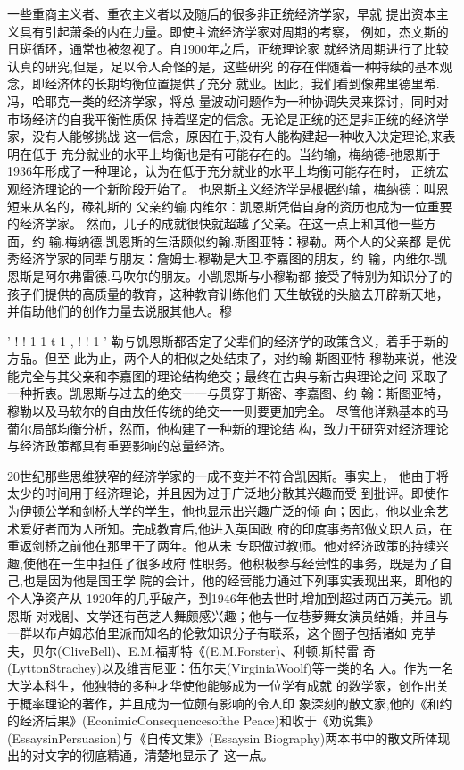 一些重商主义者、重农主义者以及随后的很多非正统经济学家，早就
提出资本主义具有引起萧条的内在力量。即使主流经济学家对周期的考察，
例如，杰文斯的日斑循环，通常也被忽视了。自1900年之后，正统理论家
就经济周期进行了比较认真的研究,但是，足以令人奇怪的是，这些研究
的存在伴随着一种持续的基本观念，即经济体的长期均衡位置提供了充分
就业。因此，我们看到像弗里德里希.冯，哈耶克一类的经济学家，将总
量波动问题作为一种协调失灵来探讨，同时对市场经济的自我平衡性质保
持着坚定的信念。无论是正统的还是非正统的经济学家，没有人能够挑战
这一信念，原因在于,没有人能构建起一种收入决定理论,来表明在低于
充分就业的水平上均衡也是有可能存在的。当约输，梅纳德-弛恩斯于
1936年形成了一种理论，认为在低于充分就业的水平上均衡可能存在时，
正统宏观经济理论的一个新阶段开始了。
也恩斯主义经济学是根据约输，梅纳德：叫恩短来从名的，碌礼斯的
父亲约输.内维尔：凯恩斯凭借自身的资历也成为一位重要的经济学家。
然而，儿子的成就很快就超越了父亲。在这一点上和其他一些方面，约
输.梅纳德.凯恩斯的生活颇似约翰.斯图亚特：穆勒。两个人的父亲都
是优秀经济学家的同辈与朋友：詹姆士.穆勒是大卫.李嘉图的朋友，约
输，内维尔-凯恩斯是阿尔弗雷德.马吹尔的朋友。小凯恩斯与小穆勒都
接受了特别为知识分子的孩子们提供的高质量的教育，这种教育训练他们
天生敏锐的头脑去开辟新天地，并借助他们的创作力量去说服其他人。穆


'
!
!
1
1
t
1
,
!
!
1
'
勒与饥恩斯都否定了父辈们的经济学的政策含义，着手于新的方品。但至
此为止，两个人的相似之处结束了，对约翰-斯图亚特-穆勒来说，他没
能完全与其父亲和李嘉图的理论结构绝交；最终在古典与新古典理论之间
采取了一种折衷。凯恩斯与过去的绝交一一与贯穿于斯密、李嘉图、约
翰：斯图亚特，穆勒以及马软尔的自由放任传统的绝交一一则要更加完全。
尽管他详熟基本的马葡尔局部均衡分析，然而，他构建了一种新的理论结
构，致力于研究对经济理论与经济政策都具有重要影响的总量经济。

20世纪那些思维狭窄的经济学家的一成不变并不符合凯因斯。事实上，
他由于将太少的时间用于经济理论，并且因为过于广泛地分散其兴趣而受
到批评。即使作为伊顿公学和剑桥大学的学生，他也显示出兴趣广泛的倾
向；因此，他以业余艺术爱好者而为人所知。完成教育后,他进入英国政
府的印度事务部做文职人员，在重返剑桥之前他在那里干了两年。他从未
专职做过教师。他对经济政策的持续兴趣,使他在一生中担任了很多政府
性职务。他积极参与经营性的事务，既是为了自己,也是因为他是国王学
院的会计，他的经营能力通过下列事实表现出来，即他的个人净资产从
1920年的几乎破产，到1946年他去世时,增加到超过两百万美元。凯恩斯
对戏剧、文学还有芭芝人舞颇感兴趣；他与一位巷萝舞女演员结婚，并且与
一群以布卢姆芯伯里派而知名的伦敦知识分子有联系，这个圈子包括诸如
克芋夫，贝尔(CliveBell)、E.M.福斯特《(E.M.Forster)、利顿.斯特雷
奇(LyttonStrachey)以及维吉尼亚：伍尔夫(VirginiaWoolf)等一类的名
人。作为一名大学本科生，他独特的多种才华使他能够成为一位学有成就
的数学家，创作出关于概率理论的著作，并且成为一位颇有影响的令人印
象深刻的散文家,他的《和约的经济后果》(EconimicConsequencesofthe
Peace)和收于《劝说集》(EssaysinPersuasion)与《自传文集》(Essaysin
Biography)两本书中的散文所体现出的对文字的彻底精通，清楚地显示了
这一点。

